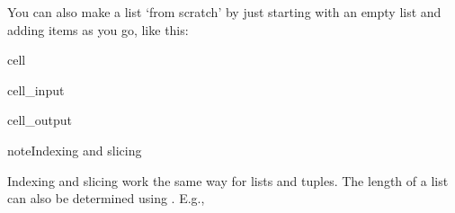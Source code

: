 \documentclass[letterpaper,10pt,english]{jupyterBook}
\begin{document}
\sphinxAtStartPar
You can also make a list ‘from scratch’ by just starting with an empty list and adding items as you go, like this:

\begin{sphinxuseclass}{cell}\begin{sphinxVerbatimInput}

\begin{sphinxuseclass}{cell_input}
\begin{sphinxVerbatim}[commandchars=\\\{\}]
  \PYG{p}{[}\PYG{p}{]}
  \PYG{p}{[} \PYG{p}{]}
\end{sphinxVerbatim}

\end{sphinxuseclass}\end{sphinxVerbatimInput}
\begin{sphinxVerbatimOutput}

\begin{sphinxuseclass}{cell_output}
\begin{sphinxVerbatim}
\end{sphinxVerbatim}

\end{sphinxuseclass}\end{sphinxVerbatimOutput}

\end{sphinxuseclass}
\begin{sphinxadmonition}{note}{Indexing and slicing }

\sphinxAtStartPar
Indexing and slicing work the same way for lists and tuples. The length of a list can also be determined using . E.g.,

\begin{sphinxVerbatim}[commandchars=\\\{\}]
  \PYG{p}{[}  \PYG{p}{]}
  
\end{sphinxVerbatim}
\end{sphinxadmonition}
\end{document}
